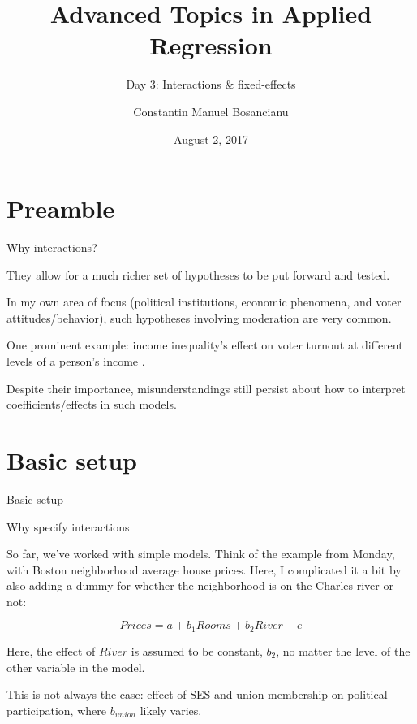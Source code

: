 \documentclass[12pt,english,pdf,xcolor=dvipsnames,aspectratio=169,handout]{beamer}\usepackage[]{graphicx}\usepackage[]{xcolor}
\title{Advanced Topics in Applied Regression}
\subtitle{Day 3: Interactions \& fixed-effects}
\author{Constantin Manuel Bosancianu}
\institute{Doctoral School of Political Science \\ Central European University, Budapest\\\href{mailto:bosancianu@icloud.com}{bosancianu@icloud.com}}
\date{August 2, 2017}
\begin{document}
\maketitle



\section{Preamble}

\begin{frame}{Why interactions?}

They allow for a much richer set of hypotheses to be put forward and tested.\bigskip

In my own area of focus (political institutions, economic phenomena, and voter attitudes/behavior), such hypotheses involving moderation are very common.\bigskip

One prominent example: income inequality's effect on voter turnout at different levels of a person's income \cite{solt2008}.\bigskip

Despite their importance, misunderstandings still persist about how to interpret coefficients/effects in such models.

\end{frame}






\section{Basic setup}

\begin{frame}
\begin{center}
    \Huge Basic setup
\end{center}
\end{frame}

\begin{frame}{Why specify interactions}

So far, we've worked with simple models. Think of the example from Monday, with Boston neighborhood average house prices. Here, I complicated it a bit by also adding a dummy for whether the neighborhood is on the Charles river or not:

\begin{equation}
Prices = a + b_1Rooms + b_2River + e
\end{equation}

Here, the effect of $River$ is assumed to be constant, $b_2$, no matter the level of the other variable in the model.\bigskip

This is not always the case: effect of SES and union membership on political participation, where $b_{union}$ likely varies.

\end{frame}
\end{document}
